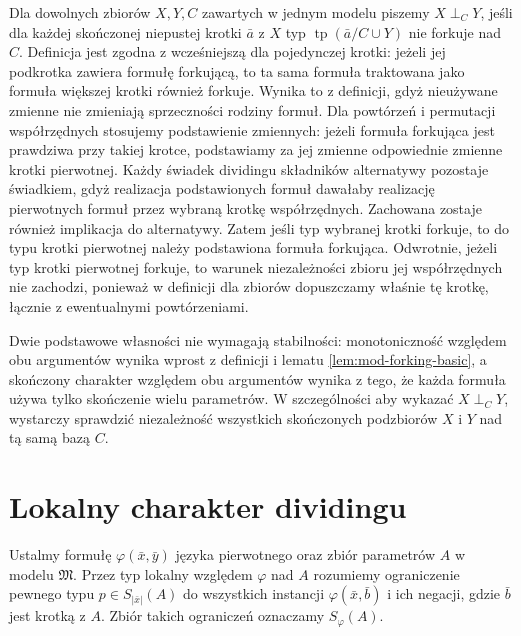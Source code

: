 Dla dowolnych zbiorów $X,Y,C$ zawartych
w jednym modelu piszemy $X\mathrel{\perp_C}Y$,
jeśli dla każdej skończonej niepustej krotki
$\bar a$ z $X$ typ $\operatorname{tp}(\bar a/C\cup Y)$
nie forkuje nad $C$. Definicja jest zgodna
z wcześniejszą dla pojedynczej krotki:
jeżeli jej podkrotka zawiera formułę forkującą,
to ta sama formuła traktowana jako formuła
większej krotki również forkuje. Wynika to
z definicji, gdyż nieużywane zmienne nie
zmieniają sprzeczności rodziny formuł.
Dla powtórzeń i permutacji współrzędnych
stosujemy podstawienie zmiennych: jeżeli formuła
forkująca jest prawdziwa przy takiej krotce,
podstawiamy za jej zmienne odpowiednie zmienne
krotki pierwotnej. Każdy świadek dividingu
składników alternatywy pozostaje świadkiem,
gdyż realizacja podstawionych formuł dawałaby
realizację pierwotnych formuł przez wybraną
krotkę współrzędnych. Zachowana zostaje również
implikacja do alternatywy. Zatem jeśli typ wybranej krotki forkuje,
to do typu krotki pierwotnej należy podstawiona
formuła forkująca. Odwrotnie, jeżeli typ krotki
pierwotnej forkuje, to warunek niezależności
zbioru jej współrzędnych nie zachodzi, ponieważ
w definicji dla zbiorów dopuszczamy właśnie tę
krotkę, łącznie z ewentualnymi powtórzeniami.

Dwie podstawowe własności nie wymagają stabilności:
monotoniczność względem obu argumentów
wynika wprost z definicji i lematu
\ref{lem:mod-forking-basic}, a skończony charakter
względem obu argumentów wynika z tego,
że każda formuła używa tylko skończenie wielu
parametrów. W szczególności aby wykazać
$X\mathrel{\perp_C}Y$, wystarczy sprawdzić
niezależność wszystkich skończonych podzbiorów
$X$ i $Y$ nad tą samą bazą $C$.

\section{Lokalny charakter dividingu}

\begin{definicja}
\label{def:mod-local-formula-type}
Ustalmy formułę $\varphi(\bar x,\bar y)$
języka pierwotnego oraz zbiór parametrów $A$
w modelu $\mathfrak M$.
Przez typ lokalny względem $\varphi$ nad $A$
rozumiemy ograniczenie pewnego typu
$p\in S_{|\bar x|}(A)$ do wszystkich instancji
$\varphi(\bar x,\bar b)$ i ich negacji,
gdzie $\bar b$ jest krotką z $A$.
Zbiór takich ograniczeń oznaczamy $S_\varphi(A)$.
\end{definicja}

